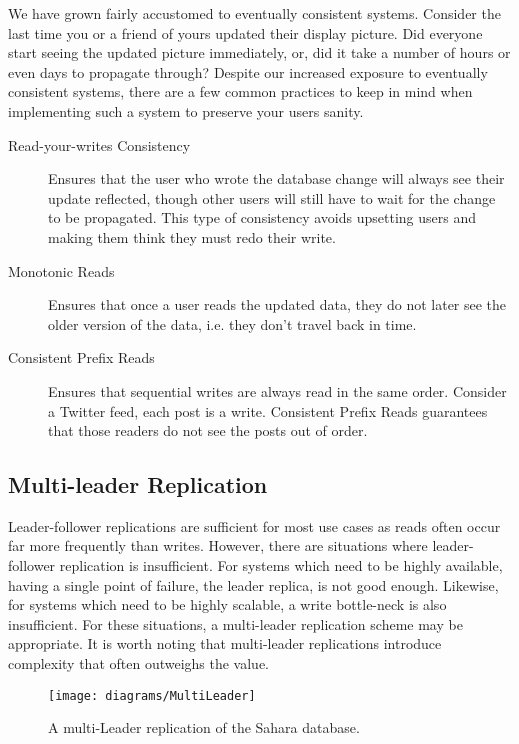 We have grown fairly accustomed to eventually consistent systems.
Consider the last time you or a friend of yours updated their display picture.
Did everyone start seeing the updated picture immediately, or,
did it take a number of hours or even days to propagate through?
Despite our increased exposure to eventually consistent systems,
there are a few common practices to keep in mind when implementing such a system to preserve your users sanity.

\begin{description}
    \item[Read-your-writes Consistency] Ensures that the user who wrote the database change will always see their update reflected, though other users will still have to wait for the change to be propagated. This type of consistency avoids upsetting users and making them think they must redo their write.
    \item[Monotonic Reads] Ensures that once a user reads the updated data, they do not later see the older version of the data, i.e. they don't travel back in time.
    \item[Consistent Prefix Reads] Ensures that sequential writes are always read in the same order. Consider a Twitter feed, each post is a write. Consistent Prefix Reads guarantees that those readers do not see the posts out of order.
\end{description}

\subsection{Multi-leader Replication}

Leader-follower replications are sufficient for most use cases as reads often occur far more frequently than writes.
However, there are situations where leader-follower replication is insufficient.
For systems which need to be highly available,
having a single point of failure,
the leader replica, is not good enough.
Likewise, for systems which need to be highly scalable,
a write bottle-neck is also insufficient.
For these situations, a multi-leader replication scheme may be appropriate.
It is worth noting that multi-leader replications introduce complexity that often outweighs the value.

\begin{figure}[ht]
    \begin{center}
    \texttt{[image: diagrams/MultiLeader]}
    \end{center}
    \caption{A multi-Leader replication of the Sahara database.}
    \label{fig:sahara-multi-leader}
\end{figure}

